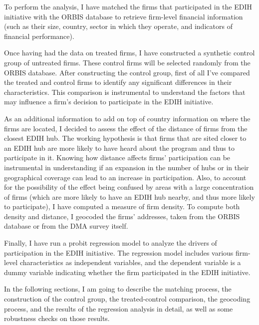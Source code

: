 \documentclass[12pt]{report}
\begin{document}
\par To perform the analysis, I have matched the firms that participated in the EDIH initiative with the ORBIS database to retrieve firm-level financial information (such as their size, country, sector in which they operate, and indicators of financial performance).

\par Once having had the data on treated firms, I have constructed a synthetic control group of untreated firms. These control firms will be selected randomly from the ORBIS database. After constructing the control group, first of all I've compared the treated and control firms to identify any significant differences in their characteristics. This comparison is instrumental to understand the factors that may influence a firm's decision to participate in the EDIH initiative.

\par As an additional information to add on top of country information on where the firms are located, I decided to assess the effect of the distance of firms from the closest EDIH hub. The working hypothesis is that firms that are sited closer to an EDIH hub are more likely to have heard about the program and thus to participate in it. Knowing how distance affects firms' participation can be instrumental in understanding if an expansion in the number of hubs or in their geographical coverage can lead to an increase in participation. Also, to account for the possibility of the effect being confused by areas with a large concentration of firms (which are more likely to have an EDIH hub nearby, and thus more likely to participate), I have computed a measure of firm density. To compute both density and distance, I geocoded the firms' addresses, taken from the ORBIS database or from the DMA survey itself.

\par Finally, I have run a probit regression model to analyze the drivers of participation in the EDIH initiative. The regression model includes various firm-level characteristics as independent variables, and the dependent variable is a dummy variable indicating whether the firm participated in the EDIH initiative.

\par In the following sections, I am going to describe the matching process, the construction of the control group, the treated-control comparison, the geocoding process, and the results of the regression analysis in detail, as well as some robustness checks on those results.
\end{document}
